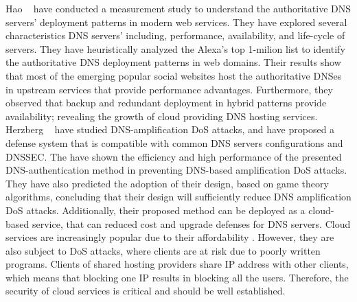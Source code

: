 Hao \etal~ have conducted a measurement study to understand the authoritative DNS servers' deployment patterns in modern web services. They have explored several characteristics DNS servers' including, performance, availability, and life-cycle of servers. They have heuristically analyzed the Alexa's top 1-milion list to identify the authoritative DNS deployment patterns in web domains. Their results show that most of the emerging popular social websites host the authoritative DNSes in upstream services that provide performance advantages. Furthermore, they observed that backup and redundant deployment in hybrid patterns provide availability; revealing the growth of cloud providing DNS hosting services.  Herzberg \etal~ have studied DNS-amplification DoS attacks, and have proposed a defense system that is compatible with common DNS servers configurations and DNSSEC. The have shown the efficiency and high performance of the presented DNS-authentication method in preventing DNS-based amplification DoS attacks. They have also predicted the adoption of their design, based on game theory algorithms, concluding that their design will sufficiently reduce DNS amplification DoS attacks. Additionally, their proposed method can be deployed as a cloud-based service, that can reduced cost and upgrade defenses for DNS servers.
 Cloud services are increasingly popular due to their affordability . However, they are also subject to DoS attacks, where clients are at risk due to poorly written programs. Clients of shared hosting providers share IP address with other clients, which means that blocking one IP results in blocking all the users. Therefore, the security of cloud services is critical and should be well established.

